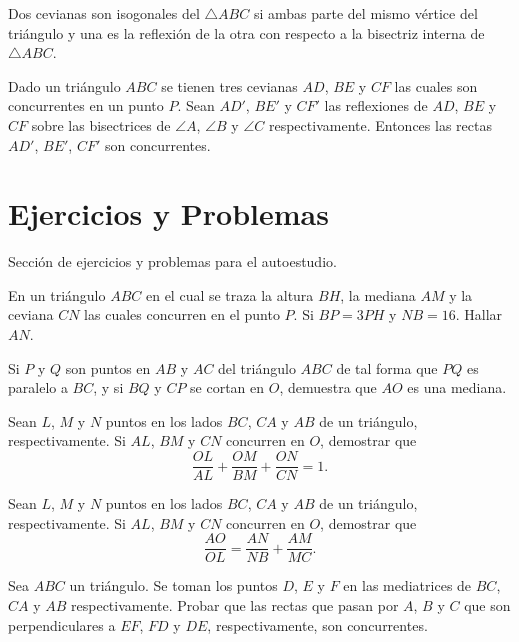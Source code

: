 \begin{section-definition}
    Dos cevianas son isogonales del $\triangle ABC$ si ambas parte del mismo vértice del triángulo y una es la reflexión de la otra con respecto a la bisectriz interna de $\triangle ABC$.
\end{section-definition}

\begin{section-definition}
    Dado un triángulo $ABC$ se tienen tres cevianas $AD$, $BE$ y $CF$ las cuales son concurrentes en un punto $P$.
    Sean $AD'$, $BE'$ y $CF'$ las reflexiones de $AD$, $BE$ y $CF$ sobre las bisectrices de $\angle A$, $\angle B$ y $\angle C$ respectivamente.
    Entonces las rectas $AD'$, $BE'$, $CF'$ son concurrentes.
\end{section-definition}

\section{Ejercicios y Problemas}
{
    Sección de ejercicios y problemas para el autoestudio.

    \begin{section-exercise}
        En un triángulo $ABC$ en el cual se traza la altura $BH$, la mediana $AM$ y la ceviana $CN$ las cuales concurren en el punto $P$.
        Si $BP = 3PH$ y $NB = 16$.
        Hallar $AN$.
    \end{section-exercise}

    \begin{section-exercise}
        Si $P$ y $Q$ son puntos en $AB$ y $AC$ del triángulo $ABC$ de tal forma que $PQ$ es paralelo a $BC$, y si $BQ$ y $CP$ se cortan en $O$, demuestra que $AO$ es una mediana.
    \end{section-exercise}

    \begin{section-exercise}
        Sean $L$, $M$ y $N$ puntos en los lados $BC$, $CA$ y $AB$ de un triángulo, respectivamente.
        Si $AL$, $BM$ y $CN$ concurren en $O$, demostrar que
        \[\frac{OL}{AL} + \frac{OM}{BM} + \frac{ON}{CN} = 1.\]
    \end{section-exercise}

    \begin{section-exercise}
        Sean $L$, $M$ y $N$ puntos en los lados $BC$, $CA$ y $AB$ de un triángulo, respectivamente.
        Si $AL$, $BM$ y $CN$ concurren en $O$, demostrar que
        \[\frac{AO}{OL} = \frac{AN}{NB} + \frac{AM}{MC}.\]
    \end{section-exercise}

    \begin{section-problem}
        Sea $ABC$ un triángulo.
        Se toman los puntos $D$, $E$ y $F$ en las mediatrices de $BC$, $CA$ y $AB$ respectivamente.
        Probar que las rectas que pasan por $A$, $B$ y $C$ que son perpendiculares a $EF$, $FD$ y $DE$, respectivamente, son concurrentes.
    \end{section-problem}
}